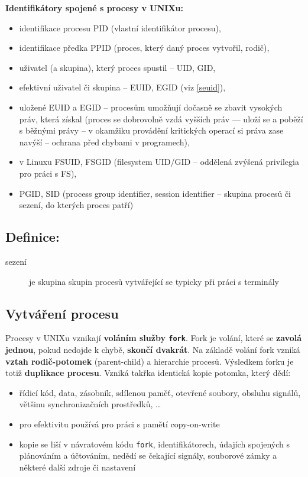 \documentclass[a4paper, 11pt]{article}
\newcommand{\tcmd}[1]{\texttt{#1}}
\begin{document}
\textbf{Identifikátory spojené s procesy v UNIXu:}
\begin{itemize}
    \item identifikace procesu PID (vlastní identifikátor procesu),
    \item identifikace předka PPID (proces, který daný proces vytvořil, rodič),
    \item uživatel (a skupina), který proces spustil -- UID, GID,
    \item efektivní uživatel či skupina -- EUID, EGID (viz \ref{seuid}),
    \item uložené EUID a EGID -- procesům umožňují dočasně se zbavit vysokých práv, která získal (proces se dobrovolně vzdá vyšších práv --- uloží se a poběží s běžnými právy -- v okamžiku provádění kritických operací si práva zase navýší -- ochrana před chybami v programech),
    \item v Linuxu FSUID, FSGID (filesystem UID/GID -- oddělená zvýšená privilegia pro práci s FS),
    \item PGID, SID (process group identifier, session identifier -- skupina procesů či sezení, do kterých proces patří)
\end{itemize}
 
\subsection*{Definice:}
\begin{description}
\item[sezení] je skupina skupin procesů vytvářející se typicky při práci s terminály
\end{description}

\subsection{Vytváření procesu} \label{fork}
Procesy v UNIXu vznikají \textbf{voláním služby \tcmd{fork}}. Fork je volání, které se \textbf{zavolá jednou}, pokud nedojde k chybě, \textbf{skončí dvakrát}. Na základě volání fork vzniká \textbf{vztah rodič-potomek} (parent-child) a hierarchie procesů. Výsledkem forku je totiž \textbf{duplikace procesu}. Vzniká takřka identická kopie potomka, který dědí:

\begin{itemize}
    \item řídicí kód, data, zásobník, sdílenou paměť, otevřené soubory, obsluhu signálů, většinu synchronizačních prostředků, \ldots
    \item pro efektivitu používá pro práci s pamětí copy-on-write
    \item kopie se liší v návratovém kódu \tcmd{fork}, identifikátorech, údajích spojených s plánováním a účtováním, nedědí se čekající signály, souborové zámky a některé další zdroje či nastavení
\end{itemize}
 
\end{document}
